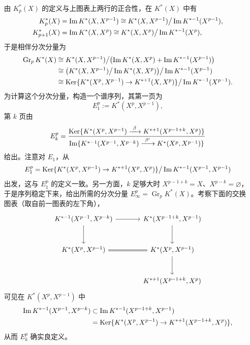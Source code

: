 由 $K^*_p(X)$ 的定义与上图表上两行的正合性，在 $K^*(X)$ 中有
\[
\begin{aligned}
K^*_p(X)&=\operatorname{Im} K^*(X,X^{p-1})\cong K^*(X,X^{p-1})\big/\operatorname{Im} K^{*-1}(X^{p-1}),\\
K^*_{p+1}(X)&=\operatorname{Im} K^*(X,X^p)\cong K^*(X,X^p)\big/\operatorname{Im} K^{*-1}(X^p),
\end{aligned}
\]
于是相伴分次分量为
\[
\begin{aligned}
\operatorname{Gr}_p K^*(X)&\cong K^*(X,X^{p-1})\big/\bigl(\operatorname{Im} K^*(X,X^p)+\operatorname{Im} K^{*-1}(X^{p-1})\bigr)\\
&\cong\bigl(K^*(X,X^{p-1})\big/\operatorname{Im} K^*(X,X^p)\bigr)\big/\operatorname{Im} K^{*-1}(X^{p-1})\\
&\cong\operatorname{Ker}\{K^*(X^p,X^{p-1})\to K^{*+1}(X,X^p)\}\big/\operatorname{Im} K^{*-1}(X^{p-1}).
\end{aligned}
\]
为计算这个分次分量，构造一个谱序列，其第一页为
\[
E^p_1:=K^*(X^p,X^{p-1}),
\]
第 $k$ 页由
\[
E^p_k=\frac{\Ker\{K^*(X^p,X^{p-1})\xrightarrow{\ \beta\ }K^{*+1}(X^{p-1+k},X^p)\}}
{\operatorname{Im}\{K^{*-1}(X^{p-1},X^{p-k})\xrightarrow{\ \beta'\ }K^*(X^p,X^{p-1})\}}
\]
给出。注意对 $E_1$，从
\[
E^p_1=\operatorname{Ker}\{K^*(X^p,X^{p-1})\to K^{*+1}(X^p,X^p)\}\big/\operatorname{Im} K^{*-1}(X^{p-1},X^{p-1})
\]
出发，这与 $E^p_1$ 的定义一致。另一方面，$k$ 足够大时 $X^{p-1+k}=X$、$X^{p-k}=\varnothing$，于是序列稳定下来，给出所需的分次分量 $E^p_\infty=\operatorname{Gr}_p K^*(X)$。考察下面的交换图表（取自前一图表的左下角），
\[
\begin{tikzcd}[row sep=large, column sep=large]
K^{*-1}(X^{p-1},X^{p-k}) \arrow[r] \arrow[d] & K^*(X^{p-1+k},X^{p-1}) \arrow[d] \\
K^*(X^p,X^{p-1}) \arrow[r,equal] & K^*(X^p,X^{p-1}) \arrow[d] \\
& K^{*+1}(X^{p-1+k},X^p)
\end{tikzcd}
\]
可见在 $K^*(X^p,X^{p-1})$ 中
\[
\begin{aligned}
\operatorname{Im} K^{*-1}(X^{p-1},X^{p-k})&\subset\operatorname{Im} K^{*-1}(X^{p-1+k},X^{p-1})\\
&=\operatorname{Ker}\{K^*(X^p,X^{p-1})\to K^{*+1}(X^{p-1+k},X^p)\},
\end{aligned}
\]
从而 $E^p_k$ 确实良定义。


